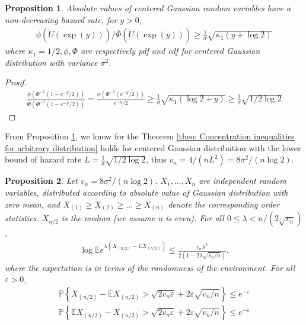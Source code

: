 \documentclass{article}
\theoremstyle{plain}
\newtheorem{prop}{Proposition}
\begin{document}
\begin{prop}
\label{prop: hazard bound for normal}
Absolute values of centered Gaussian random variables have a non-decreasing
hazard rate, for $y>0$,
\begin{align}
    \phi(\tilde{U}(\exp (y))) / \overline{\Phi}(\tilde{U}(\exp (y))) \geq \frac{1}{\sigma} \sqrt{\kappa_{1}(y+\log 2)}
\end{align}
 where $\kappa_{1} = 1 / 2, \phi, \Phi$ are respectively pdf and cdf for centered Gaussian distribution with variance $\sigma^2$.
\end{prop}

\begin{proof}
\begin{align}
    \frac{\phi\left(\Phi^{-1}\left(1-e^{-y} / 2\right)\right)}{\overline{\Phi}\left(\Phi^{-1}\left(1-e^{-y} / 2\right)\right)}=\frac{\phi\left(\Phi^{-1}\left(e^{-y} / 2\right)\right)}{e^{-y} / 2} \geq \frac{1}{\sigma} \sqrt{\kappa_{1}(\log 2+y)} \geq \frac{1}{\sigma} \sqrt{1/2\log 2}
\end{align}
\end{proof}

From Proposition \ref{prop: hazard bound for normal}, we know for the Theorem \ref{theo: Concentration inequalities for arbitrary distribution} holds for centered Gaussian distribution with the lower bound of hazard rate $L = \frac{1}{\sigma} \sqrt{1/2\log 2}$, thus $v_n = 4/(nL^2) =  8 \sigma^2/(n \log 2)$.

\iffalse
\begin{prop}
\label{prop 4.6}
Let $v_{n}=8 \sigma^2 /(n \log 2)$. $X_1, ..., X_n$ are independent random variables, distributed according to absolute value of Gaussian distribution with zero mean, and $X_{(1)} \geq X_{(2)} \geq ... \geq X_{(n)}$ denote the corresponding order statistics. $X_{n/2}$ is the median (we assume n is even). For all $0 \leq \lambda<n /\left(2 \sqrt{v_{n}}\right)$,
\begin{align}
    \label{inequality Bernstein with log for normal}
    \log \mathbb{E}e^{\lambda\left(X_{(n / 2)}-\mathbb{E} X_{(n / 2)}\right)} \leq \frac{v_{n} \lambda^{2}}{2\left(1-2 \lambda \sqrt{v_{n} / n}\right)}.
\end{align}
where the expectation is in terms of the randomness of the environment. For all $\varepsilon > 0$,
\begin{align}
    \label{inequality Bernstein upper bound for normal}
    \mathbb{P}\left\{X_{(n / 2)}-\mathbb{E} X_{(n / 2)}>\sqrt{2 v_{n} \varepsilon}+2 \varepsilon \sqrt{v_{n} / n}\right\} \leq e^{-\varepsilon}\\
    \label{inequality Bernstein lower bound for normal}
    \mathbb{P}\left\{\mathbb{E} X_{(n / 2)} - X_{(n / 2)}>\sqrt{2 v_{n} \varepsilon}+2 \varepsilon \sqrt{v_{n} / n}\right\} \leq e^{-\varepsilon}
\end{align}
\end{prop}
\end{document}
